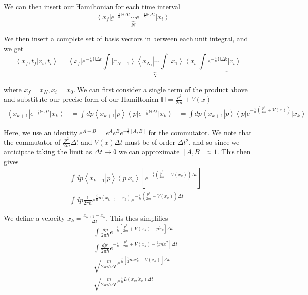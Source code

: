 \documentclass[10pt]{report}
\newcommand{\bra}[1]{\left<#1\right|}
\newcommand{\ket}[1]{\left|#1\right>}
\newcommand{\dotp}[2]{\left<#1\left.\right|#2\right>}
\begin{document}
We can then insert our Hamiltonian for each time interval
$$= \bra{x_f}\underbrace{e^{-\frac{i}{\hbar} \mathbb{H}\Delta t}\cdots e^{-\frac{i}{\hbar} \mathbb{H}\Delta t}}_N\ket{x_i}$$

We then insert a complete set of basis vectors in between each unit integral, and we get
\begin{equation}
	\dotp{x_f, t_f}{x_i, t_i} = \bra{x_f}\underbrace{e^{-\frac{i}{\hbar}\mathbb{H}\Delta t} \int \ket{x_{N-1}}\bra{x_{N_1}}\cdots \int \ket{x_1}\bra{x_i}\int e^{-\frac{i}{\hbar}\mathbb{H\Delta t}}}_N \ket{x_i}
	\label{a}
\end{equation}

where $x_f= x_N, x_i = x_0$. We can first consider a single term of the product above and substitute our precise form of our Hamiltonian $\mathbb{H} = \frac{P^2}{2m} + V(x)$
\begin{align}
	\bra{x_{k+1}}e^{-\frac{i}{\hbar}\mathbb{H}\Delta t}\ket{x_k} &= \int dp \dotp{x_{k+1}}{p}\bra{p}e^{-\frac{i}{\hbar}\mathbb{H}\Delta t}\ket{x_k}
	&= \int dp \dotp{x_{k+1}}{p}\bra{p}e^{-\frac{i}{\hbar}\left( \frac{p^2}{2m} + V(x) \right)}\ket{x_k}
\end{align}

Here, we use an identity $e^{A+B} = e^A e^B e^{-\frac{1}{2}\left[ A,B \right]}$ for the commutator. We note that the commutator of $\frac{p^2}{2m}\Delta t$ and $V(x)\Delta t$ must be of order $\Delta t^2$, and so since we anticipate taking the limit as $\Delta t \to 0$ we can approximate $\left[ A,B \right] \approx 1$. This then gives
\begin{align}
	&= \int dp \dotp{x_{k+1}}{p}\dotp{p}{x_i}\left[ e^{-\frac{i}{\hbar}\left( \frac{p^2}{2m} + V(x_k) \right)\Delta t} \right]\\
	&= \int dp \frac{1}{2\pi\hbar}e^{\frac{i}{\hbar}p\left( x_{k+1}-x_k \right)}e^{-\frac{i}{\hbar}\left( \frac{p^2}{2m} + V(x_k) \right)\Delta t}
\end{align}

We define a velocity $\dot{x}_k = \frac{x_{k+1}-x_k}{\Delta t}$. This thes simplifies
\begin{align}
	&= \int \frac{dp}{2\pi \hbar}e^{-\frac{i}{\hbar}\left[ \frac{p^2}{2m} + V(x_k) - p\dot{x}_k \right]\Delta t}\\
	&= \int \frac{dp'}{2\pi\hbar} e^{-\frac{i}{\hbar}\left[ \frac{p^2}{2m} + V(x_k) - \frac{1}{2}m\dot{x}^2 \right]\Delta t}\\
	&= \sqrt{\frac{m}{2\pi i \hbar \Delta t}} e^{\frac{i}{\hbar}\left[ \frac{1}{2}m\dot{x}_k^2 - V(x_k) \right]\Delta t}\\
	&= \sqrt{\frac{m}{2\pi i \hbar \Delta t}} e^{\frac{i}{\hbar} L(x_k, \dot{x}_k) \Delta t}
\end{align}
\end{document}
